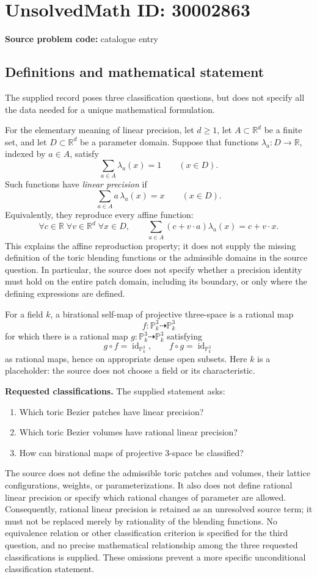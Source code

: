 \documentclass[11pt]{article}
\newcommand{\R}{\mathbb{R}}
\newcommand{\PP}{\mathbb{P}}
\begin{document}
\section*{UnsolvedMath ID: 30002863}
\textbf{Source problem code:} catalogue entry
\subsection{Definitions and mathematical statement}
The supplied record poses three classification questions, but does not specify all the data needed for a unique mathematical formulation.

For the elementary meaning of linear precision, let \(d\geq 1\), let \(A\subset\R^d\) be a finite set, and let \(D\subset\R^d\) be a parameter domain. Suppose that functions \(\lambda_a:D\to\R\), indexed by \(a\in A\), satisfy
\[
\sum_{a\in A}\lambda_a(x)=1\qquad(x\in D).
\]
Such functions have \emph{linear precision} if
\[
\sum_{a\in A}a\,\lambda_a(x)=x\qquad(x\in D).
\]
Equivalently, they reproduce every affine function:
\[
\forall c\in\R\;\forall v\in\R^d\;\forall x\in D,
\qquad
\sum_{a\in A}(c+v\cdot a)\lambda_a(x)=c+v\cdot x.
\]
This explains the affine reproduction property; it does not supply the missing definition of the toric blending functions or the admissible domains in the source question. In particular, the source does not specify whether a precision identity must hold on the entire patch domain, including its boundary, or only where the defining expressions are defined.

For a field \(k\), a birational self-map of projective three-space is a rational map
\[
f:\PP^3_k\dashrightarrow\PP^3_k
\]
for which there is a rational map \(g:\PP^3_k\dashrightarrow\PP^3_k\) satisfying
\[
g\circ f=\operatorname{id}_{\PP^3_k},\qquad
f\circ g=\operatorname{id}_{\PP^3_k}
\]
as rational maps, hence on appropriate dense open subsets. Here \(k\) is a placeholder: the source does not choose a field or its characteristic.

\textbf{Requested classifications.} The supplied statement asks:
\begin{enumerate}
\item Which toric Bezier patches have linear precision?
\item Which toric Bezier volumes have rational linear precision?
\item How can birational maps of projective \(3\)-space be classified?
\end{enumerate}
The source does not define the admissible toric patches and volumes, their lattice configurations, weights, or parameterizations. It also does not define rational linear precision or specify which rational changes of parameter are allowed. Consequently, rational linear precision is retained as an unresolved source term; it must not be replaced merely by rationality of the blending functions. No equivalence relation or other classification criterion is specified for the third question, and no precise mathematical relationship among the three requested classifications is supplied. These omissions prevent a more specific unconditional classification statement.
\end{document}
